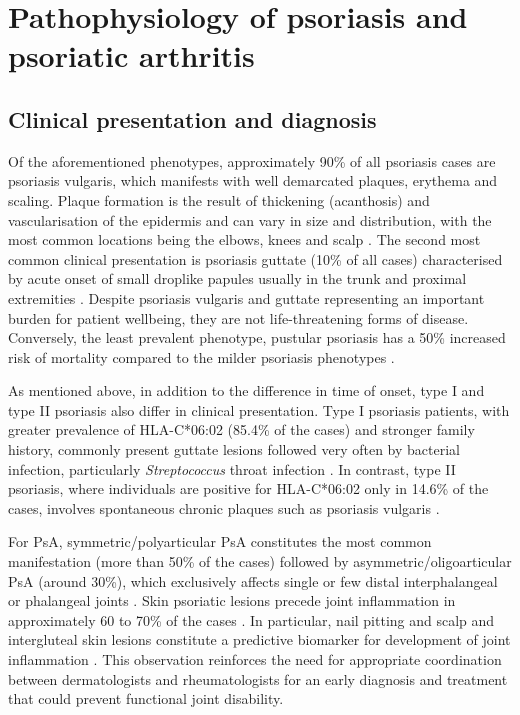 \section{Pathophysiology of psoriasis and psoriatic arthritis}

\subsection{Clinical presentation and diagnosis}
%
Of the aforementioned phenotypes, approximately 90\% of all psoriasis cases are psoriasis vulgaris, which manifests with well demarcated plaques, erythema and scaling. Plaque formation is the result of thickening (acanthosis) and vascularisation of the epidermis and can vary in size and distribution, with the most common locations being the elbows, knees and scalp \parencite{ Perera2012,Griffiths2007}. The second most common clinical presentation is psoriasis guttate (10\% of all cases) characterised by acute onset of small droplike papules usually in the trunk and proximal extremities \parencite{Vence2015}. Despite psoriasis vulgaris and guttate representing an important burden for patient wellbeing, they are not life-threatening forms of disease. Conversely, the least prevalent phenotype, pustular psoriasis has a 50\% increased risk of mortality compared to the milder psoriasis phenotypes \parencite{Gelfand2007,Moura2015}.  

As mentioned above, in addition to the difference in time of onset, type I and type II psoriasis also differ in clinical presentation. Type I psoriasis patients, with greater prevalence of HLA-C*06:02 (85.4\% of the cases) and stronger family history, commonly present guttate lesions followed very often by bacterial infection, particularly \textit{Streptococcus} throat infection \parencite{Telfer1992}. In contrast, type II psoriasis, where individuals are positive for HLA-C*06:02 only in 14.6\% of the cases, involves spontaneous chronic plaques such as psoriasis vulgaris \parencite{Perera2012}. 


For PsA, symmetric/polyarticular PsA constitutes the most common manifestation (more than 50\% of the cases) followed by asymmetric/oligoarticular PsA (around 30\%), which exclusively affects single or few distal interphalangeal or phalangeal joints \parencite{Reich2009, McGonagle2011}. Skin psoriatic lesions precede joint inflammation in approximately 60 to 70\% of the cases \parencite{Gladman2005, McGonagle2011}. In particular, nail pitting and scalp and intergluteal skin lesions constitute a predictive biomarker for development of joint inflammation \parencite{Moll1976,Griffiths2007,McGonagle,2011}. This observation reinforces the need for appropriate coordination between dermatologists and rheumatologists for an early diagnosis and treatment that could prevent functional joint disability.

